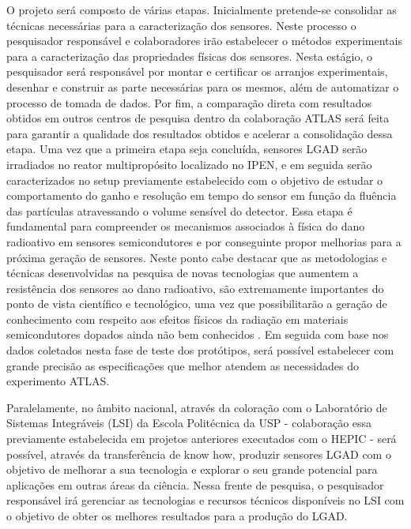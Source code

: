 O projeto será composto de várias etapas. Inicialmente pretende-se consolidar as técnicas necessárias para a caracterização dos sensores. Neste processo o pesquisador responsável e colaboradores irão estabelecer o métodos experimentais para a caracterização das propriedades físicas dos sensores. Nesta estágio, o pesquisador será responsável por montar e certificar os arranjos experimentais, desenhar e construir as parte necessárias para os mesmos, além de automatizar o processo de tomada de dados. Por fim, a comparação direta com resultados obtidos em outros centros de pesquisa dentro da colaboração ATLAS será feita para garantir a qualidade dos resultados obtidos e acelerar a consolidação dessa etapa.  
Uma vez que a primeira etapa seja concluída, sensores LGAD serão irradiados no reator multipropósito localizado no IPEN, e em seguida serão caracterizados no setup previamente estabelecido com o objetivo de estudar o comportamento do ganho e resolução em tempo do sensor em função da fluência das partículas atravessando o volume sensível do detector. Essa etapa é fundamental para compreender os mecanismos associados à física do dano radioativo em sensores semicondutores e por conseguinte propor melhorias para a próxima geração de sensores. 
Neste ponto cabe destacar que as metodologias e técnicas desenvolvidas na pesquisa de novas tecnologias que aumentem a resistência dos sensores ao dano radioativo, são extremamente importantes do ponto de vista científico e tecnológico, uma vez que possibilitarão a geração de conhecimento com respeito aos efeitos físicos da radiação em materiais semicondutores dopados ainda não bem conhecidos \cite{tdr,JIN_LGAD,NIMA_LGAD}. %
Em seguida com base nos dados coletados nesta fase de teste dos protótipos, será possível estabelecer com grande precisão as especificações que melhor atendem as necessidades do experimento ATLAS. 


Paralelamente, no âmbito nacional, através da coloração com o Laboratório de Sistemas Integráveis (LSI) da Escola Politécnica da USP - colaboração essa previamente estabelecida em projetos anteriores executados com o HEPIC \cite{ALICEUP,ref1} - será possível, através da transferência de know how, produzir sensores LGAD com o objetivo de melhorar a sua tecnologia e explorar o seu grande potencial para aplicações em outras áreas da ciência. Nessa frente de pesquisa, o pesquisador responsável irá gerenciar as tecnologias e recursos técnicos disponíveis no LSI com o objetivo de obter os melhores resultados para a produção do LGAD.  

